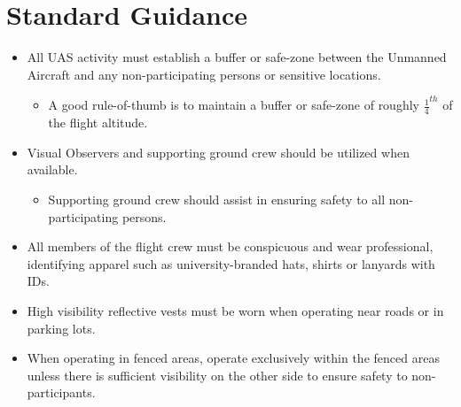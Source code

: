 \documentclass[
]{book}
\makeatletter
\providecommand{\tightlist}{%
  \setlength{\itemsep}{0pt}\setlength{\parskip}{0pt}}
\let\origdoublepage\cleardoublepage
\newcommand{\clearemptydoublepage}{\clearpage{\pagestyle{empty}\origdoublepage}}
\let\cleardoublepage\clearemptydoublepage
\renewcommand\part{%
   \if@openright
     \cleardoublepage
   \else
     \clearpage
   \fi
   \thispagestyle{empty}%
   \if@twocolumn
     \onecolumn
     \@tempswatrue
   \else
     \@tempswafalse
   \fi
   \null\vfil
   \secdef\@part\@spart}
\makeatother
\begin{document}
\hypertarget{part-uc-operating-standards}{%
\part{UC Operating Standards}\label{part-uc-operating-standards}}

\hypertarget{standard-guidance}{%
\chapter{Standard Guidance}\label{standard-guidance}}

\begin{itemize}
\tightlist
\item
  All UAS activity must establish a buffer or safe-zone between the Unmanned Aircraft and any non-participating persons or sensitive locations.

  \begin{itemize}
  \tightlist
  \item
    A good rule-of-thumb is to maintain a buffer or safe-zone of roughly \(\frac{1}{4}^{th}\) of the flight altitude.
  \end{itemize}
\item
  Visual Observers and supporting ground crew should be utilized when available.

  \begin{itemize}
  \tightlist
  \item
    Supporting ground crew should assist in ensuring safety to all non-participating persons.
  \end{itemize}
\item
  All members of the flight crew must be conspicuous and wear professional, identifying apparel such as university-branded hats, shirts or lanyards with IDs.
\item
  High visibility reflective vests must be worn when operating near roads or in parking lots.\\
\item
  When operating in fenced areas, operate exclusively within the fenced areas unless there is sufficient visibility on the other side to ensure safety to non-participants.
\end{itemize}
\end{document}
